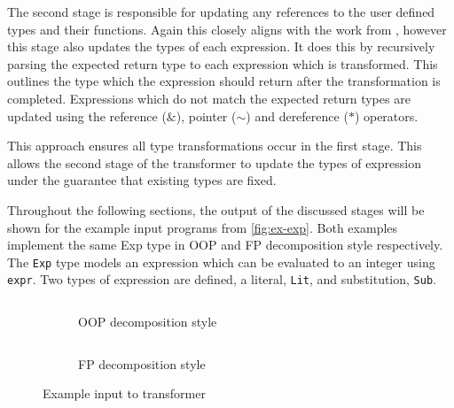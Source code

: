 \documentclass[ oneside,%
                    author={James Elgar},
                    degree={MEng},
                     title={Bidirectional transformer between functional and \\ object-oriented programming in Rust},
                  subtitle={}]{dissertation}
\newcommand{\rust}[1]{\texttt{#1}}
\newcommand{\codefileLN}[4]{\inputminted[xleftmargin=20pt,linenos, breaklines, firstline=#3, lastline=#4]{#1}{#2}}
\newcommand{\rustfileLN}[3]{\codefileLN{rust}{../#1.rs}{#2}{#3}}
\newcommand{\rustexampleLN}[3]{\rustfileLN{examples/src/#1}{#2}{#3}}
\begin{document}
The second stage is responsible for updating any references to the user defined types and their functions. Again this closely aligns with the work from \cite{food}, however this stage also updates the types of each expression. It does this by recursively parsing the expected return type to each expression which is transformed. This outlines the type which the expression should return after the transformation is completed. Expressions which do not match the expected return types are updated using the reference ($\&$), pointer ($\sim$) and dereference ($*$) operators. 

This approach ensures all type transformations occur in the first stage. This allows the second stage of the transformer to update the types of expression under the guarantee that existing types are fixed. 

Throughout the following sections, the output of the discussed stages will be shown for the example input programs from \autoref{fig:ex-exp}. Both examples implement the same Exp type in OOP and FP decomposition style respectively. The \rust{Exp} type models an expression which can be evaluated to an integer using \rust{expr}. Two types of expression are defined, a literal, \rust{Lit}, and substitution, \rust{Sub}.

\begin{figure}
\centering
\begin{subfigure}{.5\textwidth}
    \rustexampleLN{exp/oop}{1}{22}
    \caption{OOP decomposition style}
\end{subfigure}%
\begin{subfigure}{.5\textwidth}
    \rustexampleLN{exp/fp}{1}{11}
    \caption{FP decomposition style}
\end{subfigure}
\caption{Example input to transformer}
\label{fig:ex-exp}
\end{figure}

        
\end{document}
